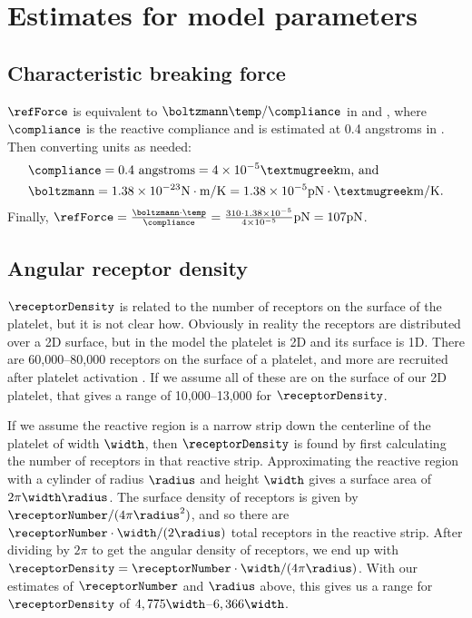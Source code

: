 \section{Estimates for model parameters}
\label{sec:estim-model-param}

\subsection{Characteristic breaking force}
\label{sec:char-break-force}

$\refForce$ is equivalent to $\boltzmann\temp/\compliance$ in
\cite{Pospieszalska2009} and \cite{Sundd2011}, where $\compliance$ is
the reactive compliance and is estimated at 0.4 angstroms in
\cite{Bhatia2003}. Then converting units as needed:
\begin{align*}
  &\compliance = 0.4 \text{ angstroms} = 4 \times 10^{-5}
    \text{{\textmugreek}m} \text{, and} \\
  &\boltzmann = 1.38 \times 10^{-23} \text{N}\cdot\text{m}/\text{K} =
    1.38 \times 10^{-5} \text{pN}\cdot\text{{\textmugreek}m}/\text{K}.
\end{align*}
Finally, $\refForce = \frac{\boltzmann\cdot\temp}{\compliance} =
\frac{310 \cdot 1.38 \times 10^{-5}}{4 \times 10^{-5}} \text{pN} = 107
\text{pN}$.

\subsection{Angular receptor density}
\label{sec:ang-rec-dens}

$\receptorDensity$ is related to the number of receptors on the
surface of the platelet, but it is not clear how. Obviously in reality
the receptors are distributed over a 2D surface, but in the model the
platelet is 2D and its surface is 1D. There are 60,000--80,000 
  receptors on the surface of a platelet, and more are
recruited after platelet activation
\cite{Shattil1998,Litvinov2011}. If we assume all of these are on the
surface of our 2D platelet, that gives a range of 10,000--13,000 for
$\receptorDensity$. 

If we assume the reactive region is a narrow strip down the centerline
of the platelet of width $\width$, then $\receptorDensity$ is found by
first calculating the number of receptors in that reactive
strip. Approximating the reactive region with a cylinder of radius
$\radius$ and height $\width$ gives a surface area of
$2\pi\width\radius$. The surface density of receptors is given by
$\receptorNumber/(4\pi\radius^2)$, and so there are
$\receptorNumber\cdot\width/(2\radius)$ total receptors in the
reactive strip. After dividing by $2\pi$ to get the angular density of
receptors, we end up with $\receptorDensity =
\receptorNumber\cdot\width/(4\pi\radius)$. With our estimates of
$\receptorNumber$ and $\radius$ above, this gives us a range for
$\receptorDensity$ of $4,775\width$--$6,366\width$.

